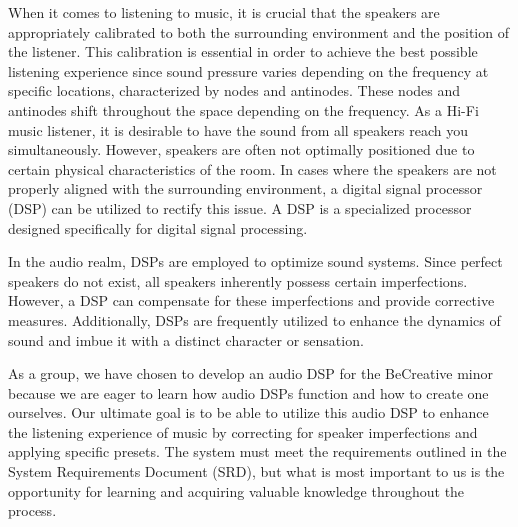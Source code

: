 When it comes to listening to music, it is crucial that the speakers are appropriately calibrated to both the surrounding environment and the position of the listener. This calibration is essential in order to achieve the best possible listening experience since sound pressure varies depending on the frequency at specific locations, characterized by nodes and antinodes. These nodes and antinodes shift throughout the space depending on the frequency. As a Hi-Fi music listener, it is desirable to have the sound from all speakers reach you simultaneously. However, speakers are often not optimally positioned due to certain physical characteristics of the room. In cases where the speakers are not properly aligned with the surrounding environment, a digital signal processor (DSP) can be utilized to rectify this issue. A DSP is a specialized processor designed specifically for digital signal processing.

\noindent In the audio realm, DSPs are employed to optimize sound systems. Since perfect speakers do not exist, all speakers inherently possess certain imperfections. However, a DSP can compensate for these imperfections and provide corrective measures. Additionally, DSPs are frequently utilized to enhance the dynamics of sound and imbue it with a distinct character or sensation.

\noindent As a group, we have chosen to develop an audio DSP for the BeCreative minor because we are eager to learn how audio DSPs function and how to create one ourselves. Our ultimate goal is to be able to utilize this audio DSP to enhance the listening experience of music by correcting for speaker imperfections and applying specific presets. The system must meet the requirements outlined in the System Requirements Document (SRD), but what is most important to us is the opportunity for learning and acquiring valuable knowledge throughout the process.